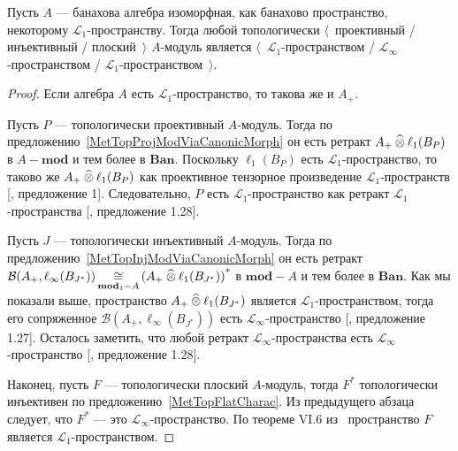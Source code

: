 \begin{proposition}\label{TopProjInjFlatModOverMthscrL1SpCharac} Пусть $A$ ---
банахова алгебра изоморфная, как банахово пространство, некоторому
$\mathscr{L}_1$-пространству. Тогда любой топологически $\langle$~проективный /
инъективный / плоский~$\rangle$ $A$-модуль является
$\langle$~$\mathscr{L}_1$-пространством / $\mathscr{L}_\infty$-пространством /
$\mathscr{L}_1$-пространством~$\rangle$.
\end{proposition}
\begin{proof} Если алгебра $A$ есть $\mathscr{L}_1$-пространство, то такова же и
$A_+$. 

Пусть $P$ --- топологически проективный $A$-модуль. Тогда по
предложению~\ref{MetTopProjModViaCanonicMorph} он есть ретракт $A_+\mathbin{\widehat{\otimes}}
\ell_1(B_P)$ в $A-\mathbf{mod}$ и тем более в $\mathbf{Ban}$. Поскольку
$\ell_1(B_P)$ есть $\mathscr{L}_1$-пространство, то таково же
$A_+\mathbin{\widehat{\otimes}}\ell_1(B_P)$ как проективное тензорное произведение
$\mathscr{L}_1$-пространств [\cite{GonzDPPInTensProd}, предложение 1].
Следовательно, $P$ есть $\mathscr{L}_1$-пространство как ретракт
$\mathscr{L}_1$-пространства [\cite{BourgNewClOfLpSp}, предложение 1.28].

Пусть $J$ --- топологически инъективный $A$-модуль. Тогда по
предложению~\ref{MetTopInjModViaCanonicMorph} он есть ретракт
$\mathcal{B}(A_+,\ell_\infty(B_{J^*}))
\mathop{\mathbin{\cong}}\limits_{\mathbf{mod}_1-A}{(A_+\mathbin{\widehat{\otimes}}\ell_1(B_{J^*}))}^*$
в $\mathbf{mod}-A$ и тем более в $\mathbf{Ban}$. Как мы показали выше,
пространство $A_+\mathbin{\widehat{\otimes}}\ell_1(B_{J^*})$ является
$\mathscr{L}_1$-пространством, тогда его сопряженное
$\mathcal{B}(A_+,\ell_\infty(B_{J^*}))$ есть $\mathscr{L}_\infty$-пространство
[\cite{BourgNewClOfLpSp}, предложение 1.27]. Осталось заметить, что любой
ретракт $\mathscr{L}_\infty$-пространства есть $\mathscr{L}_\infty$-пространство
[\cite{BourgNewClOfLpSp}, предложение 1.28].

Наконец, пусть $F$ --- топологически плоский $A$-модуль, тогда $F^*$
топологически инъективен по предложению~\ref{MetTopFlatCharac}. Из предыдущего
абзаца следует, что $F^*$ --- это $\mathscr{L}_\infty$-пространство. По теореме
VI.6 из~\cite{StegRethNucOpL1LInfSp} пространство $F$ является
$\mathscr{L}_1$-пространством.
\end{proof}

